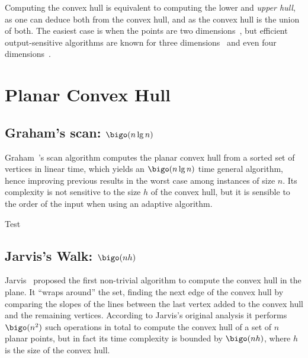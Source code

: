 Computing the convex hull is equivalent to computing the lower and
{\em upper hull}, as one can deduce both from the convex hull, and as
the convex hull is the union of both.
%
The easiest case is when the points are two
dimensions~\cite{kirkpatrick,jarvis73,graham72}, but efficient
output-sensitive algorithms are known for three
dimensions~\cite{optimalOutputSensitiveConvexHullAlgorithmsInTwoAndThreeDimensions}
and even four dimensions~\cite{DBLP:journals/dcg/ChanSY97}.



\section{Planar Convex Hull}
\label{sec:planar-convex-hull}


\subsection{Graham's scan:  $\bigo(n\lg n)$}
\label{sec:grahams-scan}


Graham~\cite{graham72}'s scan algorithm computes the planar convex
hull from a sorted set of vertices in linear time, which yields an
$\bigo(n\lg n)$ time general algorithm, hence improving previous
results in the worst case among instances of size $n$.
%
Its complexity is not sensitive to the size $h$ of the convex hull,
but it is sensible to the order of the input when using an adaptive
algorithm.

\begin{algorithm}
  \begin{algorithmic}
    \STATE Test
  \end{algorithmic}
\end{algorithm}

\subsection{Jarvis's Walk: $\bigo (nh)$}
\label{sec:jarviss-walk}


Jarvis~\cite{jarvis73} proposed the first non-trivial algorithm to
compute the convex hull in the plane.
%
It ``wraps around'' the set, finding the next edge of the convex hull
by comparing the slopes of the lines between the last vertex added to
the convex hull and the remaining vertices.
%
According to Jarvis's original analysis it performs $\bigo(n^2)$ such
operations in total to compute the convex hull of a set of $n$ planar
points, but in fact its time complexity is bounded by $\bigo (nh)$,
where $h$ is the size of the convex hull.



